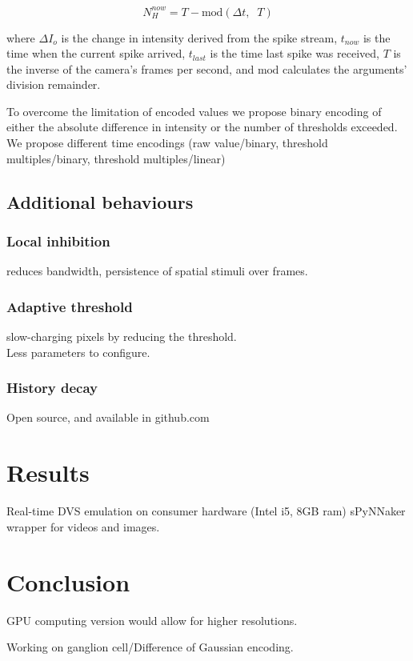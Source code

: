 \documentclass[twocolumn]{article}
\begin{document}
\begin{equation}
 N_{H}^{now} = T - \mathrm{mod}\left(\Delta t, \;\; T\right)
 \label{eq:new_Nh_linear}
\end{equation}




where $\Delta I_o$ is the change in intensity derived from the spike stream, $t_{now}$ is the time when the current spike arrived, $t_{last}$ is the time last spike was received, $T$ is the inverse of the camera's frames per second, and $\mathrm{mod}$ calculates the arguments' division remainder.

To overcome the limitation of encoded values we propose binary encoding of either the absolute difference in intensity or the number of thresholds exceeded. 
We propose different time encodings (raw value/binary, threshold multiples/binary, threshold multiples/linear)\\

\subsection{Additional behaviours}
\subsubsection{Local inhibition} reduces bandwidth, persistence of spatial stimuli over frames. 
\subsubsection{Adaptive threshold} slow-charging pixels by reducing the threshold.\\
Less parameters to configure.
\subsubsection{History decay}
Open source, and available in github.com\\

\section{Results}

Real-time DVS emulation on consumer hardware (Intel i5, 8GB ram)
sPyNNaker wrapper for videos and images.

\section{Conclusion}

GPU computing version would allow for higher resolutions.

Working on ganglion cell/Difference of Gaussian encoding.

\printbibliography
\end{document}
